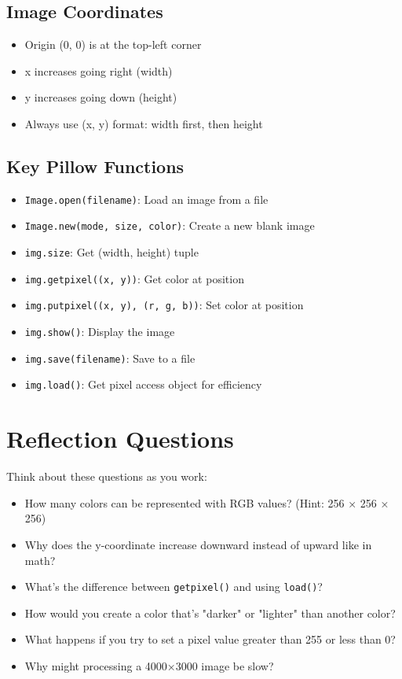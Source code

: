 \documentclass[11pt]{article}
\begin{document}
\subsection*{Image Coordinates}
\begin{itemize}
    \item Origin (0, 0) is at the top-left corner
    \item x increases going right (width)
    \item y increases going down (height)
    \item Always use (x, y) format: width first, then height
\end{itemize}

\subsection*{Key Pillow Functions}
\begin{itemize}
    \item \texttt{Image.open(filename)}: Load an image from a file
    \item \texttt{Image.new(mode, size, color)}: Create a new blank image
    \item \texttt{img.size}: Get (width, height) tuple
    \item \texttt{img.getpixel((x, y))}: Get color at position
    \item \texttt{img.putpixel((x, y), (r, g, b))}: Set color at position
    \item \texttt{img.show()}: Display the image
    \item \texttt{img.save(filename)}: Save to a file
    \item \texttt{img.load()}: Get pixel access object for efficiency
\end{itemize}

\section*{Reflection Questions}

Think about these questions as you work:

\begin{itemize}
    \item How many colors can be represented with RGB values? (Hint: 256 × 256 × 256)
    \item Why does the y-coordinate increase downward instead of upward like in math?
    \item What's the difference between \texttt{getpixel()} and using \texttt{load()}?
    \item How would you create a color that's "darker" or "lighter" than another color?
    \item What happens if you try to set a pixel value greater than 255 or less than 0?
    \item Why might processing a 4000×3000 image be slow?
\end{itemize}
\end{document}

